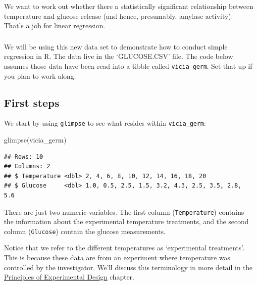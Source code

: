 \documentclass[
]{book}
\newenvironment{Shaded}{\begin{snugshade}}{\end{snugshade}}
\newcommand{\FunctionTok}[1]{\textcolor[rgb]{0.00,0.00,0.00}{#1}}
\newcommand{\NormalTok}[1]{#1}
\newenvironment{greybox}{
  \definecolor{shadecolor}{rgb}{0.95,0.95,0.95}  %
  \color{black}
  \begin{shaded}}
 {\end{shaded}}
\newenvironment{infobox}[1]
  {
  \begin{itemize}
  \renewcommand{\labelitemi}{
    \raisebox{-.7\height}[0pt][0pt]{
      {\setkeys{Gin}{width=3em,keepaspectratio}
        \texttt{[image: images/\#1]}}
    }
  }
  \setlength{\fboxsep}{1em}
  \begin{greybox}
  \item
  }
  {
  \end{greybox}
  \end{itemize}
  }
\begin{document}
We want to work out whether there a statistically significant relationship between temperature and glucose release (and hence, presumably, amylase activity). That's a job for linear regression.

\begin{infobox}{action}

\hypertarget{section-6}{%
\subsubsection*{}\label{section-6}}

We will be using this new data set to demonstrate how to conduct simple regression in R. The data live in the `GLUCOSE.CSV' file. The code below assumes those data have been read into a tibble called \texttt{vicia\_germ}. Set that up if you plan to work along.

\end{infobox}

\hypertarget{first-steps}{%
\subsection{First steps}\label{first-steps}}

We start by using \texttt{glimpse} to see what resides within \texttt{vicia\_germ}:

\begin{Shaded}
\begin{Highlighting}[]
\FunctionTok{glimpse}\NormalTok{(vicia\_germ)}
\end{Highlighting}
\end{Shaded}

\begin{verbatim}
## Rows: 10
## Columns: 2
## $ Temperature <dbl> 2, 4, 6, 8, 10, 12, 14, 16, 18, 20
## $ Glucose     <dbl> 1.0, 0.5, 2.5, 1.5, 3.2, 4.3, 2.5, 3.5, 2.8, 5.6
\end{verbatim}

There are just two numeric variables. The first column (\texttt{Temperature}) contains the information about the experimental temperature treatments, and the second column (\texttt{Glucose}) contain the glucose measurements.

Notice that we refer to the different temperatures as `experimental treatments'. This is because these data are from an experiment where temperature was controlled by the investigator. We'll discuss this terminology in more detail in the \protect\hyperlink{principles-experimental-design}{Principles of Experimental Design} chapter.
\end{document}
